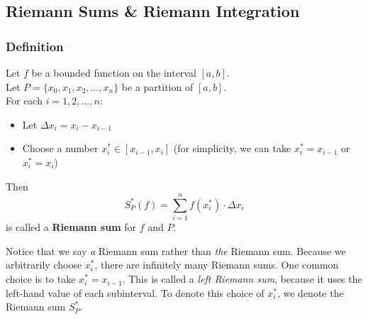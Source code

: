 \documentclass[10pt]{article}
\newenvironment{definition}[1][]{\begin{tcolorbox}[colframe=_orange,colback=_orange2,title=Definition. \ifthenelse{\isempty{#1}}{}{(#1)}
]}{\end{tcolorbox}}
\begin{document}
\subsection{Riemann Sums \& Riemann Integration}
\subsubsection{Definition}
\begin{definition}
    Let $f$ be a bounded function on the interval $[a,b]$. \\
    Let $P=\{x_0,x_1,x_2,\dots,x_n\}$ be a partition of $[a,b]$. \\
    For each $i=1,2,\dots,n$:
    \begin{itemize}
        \item Let $\Delta x_i=x_i-x_{i-1}$
        \item Choose a number $x_i^*\in[x_{i-1},x_i]$ (for simplicity, we can take $x_i^*=x_{i-1}$ or $x_i^*=x_i$)
    \end{itemize}
    Then
    $$
        S_P^*(f)=\sum_{i=1}^nf(x_i^*)\cdot\Delta x_i
    $$
    is called a \textbf{Riemann sum} for $f$ and $P$.
\end{definition}
Notice that we say \textit{a} Riemann sum rather than \textit{the} Riemann sum. Because we arbitrarily choose $x_i^*$, there are infinitely many Riemann sums. One common choice is to take $x_i^*=x_{i-1}$. This is called a \textit{left Riemann sum}, because it uses the left-hand value of each subinterval. To denote this choice of $x_i^*$, we denote the Riemann sum $S_P^*$.
\end{document}
